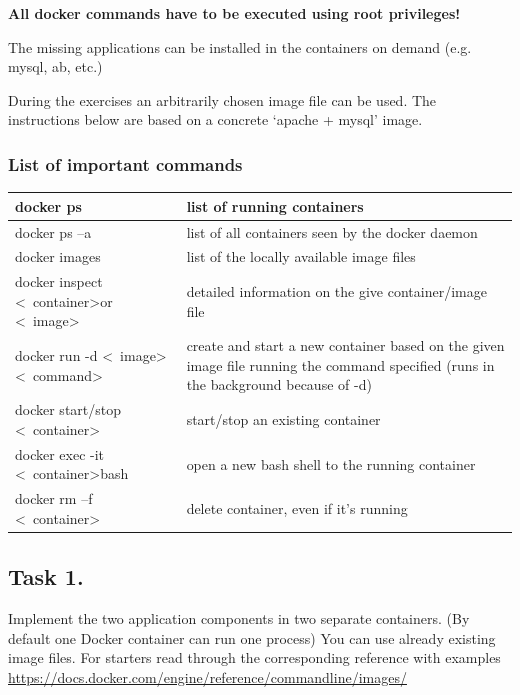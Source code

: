 \documentclass[a4paper]{article}
\begin{document}
\textbf{All docker commands have to be executed using root privileges!}

The missing applications can be installed in the containers on demand (e.g. mysql, ab, etc.)

During the exercises an arbitrarily chosen image file can be used. The instructions below are based on a concrete `apache + mysql' image.

\subsubsection{List of important commands}
\begin{table}[h]
\begin{tabularx}{\textwidth}{|l|X|}
\hline docker ps & list of running containers \\
\hline docker ps –a &  list of all containers seen by the docker daemon \\
\hline docker images  &  list of the locally available image files \\
\hline docker inspect \textless~container\textgreater or \textless~image\textgreater  &  detailed information on the give container/image file \\
\hline docker run -d \textless~image\textgreater \textless~command\textgreater &  create and start a new container based on the given image file running the command specified (runs in the background because of -d) \\
\hline docker start/stop \textless~container\textgreater  &  start/stop an existing container \\
\hline docker exec -it \textless~container\textgreater bash & open a new bash shell to the running container \\
\hline docker rm –f \textless~container\textgreater  &  delete container, even if it's running \\
\hline
\end{tabularx}
\end{table}

\subsection{Task 1.}

Implement the two application components in two separate containers. (By default one Docker container can run one process)
You can use already existing image files. For starters read through the corresponding reference with examples \url{https://docs.docker.com/engine/reference/commandline/images/}
\end{document}
